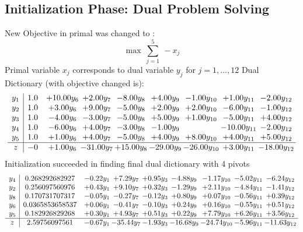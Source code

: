\documentclass[9pt]{article}
\begin{document}
\subsection{Initialization Phase: Dual Problem Solving}
New Objective in primal was changed to : \[ \max\ \sum_{j=1}^{5}\ - x_j \] 
Primal variable $x_j$ corresponds to dual variable $y_j$ for $j = 1,\ldots,12$
Dual Dictionary (with objective changed is): 
\[\begin{array}{c| c c@{\hskip 2pt} c@{\hskip 2pt} c@{\hskip 2pt} c@{\hskip 2pt} c@{\hskip 2pt} c@{\hskip 2pt} c@{\hskip 2pt} }
 y_{1}   &  1.0 & + 10.00 y_{6} & +  2.00 y_{7} & -8.00 y_{8} & +  4.00 y_{9} & -1.00 y_{10} & +  1.00 y_{11} & -2.00 y_{12}\\
 y_{2}   &  1.0 & +  3.00 y_{6} & +  9.00 y_{7} & -5.00 y_{8} & +  2.00 y_{9} & +  2.00 y_{10} & -6.00 y_{11} & -1.00 y_{12}\\
 y_{3}   &  1.0 & -4.00 y_{6} & -3.00 y_{7} & -5.00 y_{8} & +  5.00 y_{9} & +  1.00 y_{10} & -5.00 y_{11} & +  4.00 y_{12}\\
 y_{4}   &  1.0 & -6.00 y_{6} & +  4.00 y_{7} & -3.00 y_{8} & -1.00 y_{9} &   & -10.00 y_{11} & -2.00 y_{12}\\
 y_{5}   &  1.0 & +  1.00 y_{6} & +  4.00 y_{7} & -5.00 y_{8} & +  4.00 y_{9} & +  8.00 y_{10} & +  4.00 y_{11} & +  5.00 y_{12}\\
\hline
z    &  -0 & +  1.00 y_{6} & -31.00 y_{7} & + 15.00 y_{8} & -29.00 y_{9} & -26.00 y_{10} & +  3.00 y_{11} & -18.00 y_{12}\\
\end{array}\]
Initialization succeeded in finding final dual dictionary with 4 pivots
\[\begin{array}{c| c c@{\hskip 2pt} c@{\hskip 2pt} c@{\hskip 2pt} c@{\hskip 2pt} c@{\hskip 2pt} c@{\hskip 2pt} c@{\hskip 2pt} }
 y_{4}   &  0.268292682927 & -0.22 y_{1} & +  7.29 y_{7} & +  0.95 y_{3} & -4.88 y_{9} & -1.17 y_{10} & -5.02 y_{11} & -6.24 y_{12}\\
 y_{2}   &  0.256097560976 & +  0.43 y_{1} & +  9.10 y_{7} & +  0.32 y_{3} & -1.29 y_{9} & +  2.11 y_{10} & -4.84 y_{11} & -1.41 y_{12}\\
 y_{8}   &  0.170731707317 & -0.05 y_{1} & -0.27 y_{7} & -0.12 y_{3} & +  0.80 y_{9} & +  0.07 y_{10} & -0.56 y_{11} & +  0.39 y_{12}\\
 y_{6}   &  0.0365853658537 & +  0.06 y_{1} & -0.41 y_{7} & -0.10 y_{3} & +  0.24 y_{9} & +  0.16 y_{10} & -0.55 y_{11} & +  0.51 y_{12}\\
 y_{5}   &  0.182926829268 & +  0.30 y_{1} & +  4.93 y_{7} & +  0.51 y_{3} & +  0.22 y_{9} & +  7.79 y_{10} & +  6.26 y_{11} & +  3.56 y_{12}\\
\hline
z    &  2.59756097561 & -0.67 y_{1} & -35.44 y_{7} & -1.93 y_{3} & -16.68 y_{9} & -24.74 y_{10} & -5.96 y_{11} & -11.63 y_{12}\\
\end{array}\]
\end{document}
